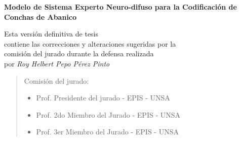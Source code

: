 \documentclass[12pt,oneside,a4paper]{book}
\begin{document}
\newpage
\thispagestyle{empty}
    \begin{center}
        \vspace*{2.3 cm}
        \textbf{\Large{Modelo de Sistema Experto Neuro-difuso para la Codificación de Conchas de Abanico}}\\
        \vspace*{2 cm}
    \end{center}

    \vskip 2cm

    \begin{flushright}
          Esta versión definitiva de tesis\\
          contiene las correcciones y alteraciones sugeridas por la \\
          comisión del jurado durante la defensa realizada\\
          por \textit{Roy Helbert Pepo Pérez Pinto}
    \vskip 2cm

    \end{flushright}
    \vskip 4.2cm

    \begin{quote}
    \noindent Comisión del jurado:
    
    \begin{itemize}
		\item Prof. Presidente del jurado  - EPIS - UNSA 
		\item Prof. 2do Miembro del Jurado - EPIS - UNSA  
		\item Prof. 3er Miembro del Jurado - EPIS - UNSA  
    \end{itemize}
      
    \end{quote}
\pagebreak

\end{document}
